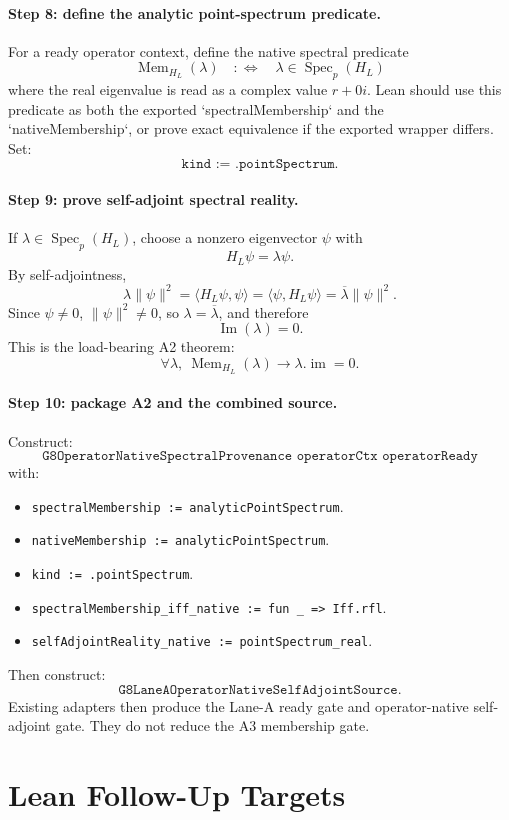 \documentclass[11pt]{article}
\newcommand{\im}{\operatorname{Im}}
\newcommand{\Mem}{\operatorname{Mem}}
\newcommand{\ptspec}{\operatorname{Spec}_{p}}
\begin{document}
\paragraph{Step 8: define the analytic point-spectrum predicate.}
For a ready operator context, define the native spectral predicate
\[
  \Mem_{H_L}(\lambda)
  \quad:\Longleftrightarrow\quad
  \lambda\in\ptspec(H_L)
\]
where the real eigenvalue is read as a complex value \(r+0i\).  Lean should use
this predicate as both the exported `spectralMembership` and the
`nativeMembership`, or prove exact equivalence if the exported wrapper differs.
Set:
\[
  \texttt{kind := .pointSpectrum}.
\]

\paragraph{Step 9: prove self-adjoint spectral reality.}
If \(\lambda\in\ptspec(H_L)\), choose a nonzero eigenvector \(\psi\) with
\[
  H_L\psi=\lambda\psi.
\]
By self-adjointness,
\[
  \lambda\|\psi\|^2
  =
  \langle H_L\psi,\psi\rangle
  =
  \langle \psi,H_L\psi\rangle
  =
  \overline{\lambda}\|\psi\|^2.
\]
Since \(\psi\ne0\), \(\|\psi\|^2\ne0\), so \(\lambda=\overline{\lambda}\), and
therefore
\[
  \im(\lambda)=0.
\]
This is the load-bearing A2 theorem:
\[
  \forall \lambda,\ \Mem_{H_L}(\lambda)\to\lambda.\operatorname{im}=0.
\]

\paragraph{Step 10: package A2 and the combined source.}
Construct:
\[
  \texttt{G8OperatorNativeSpectralProvenance operatorCtx operatorReady}
\]
with:
\begin{itemize}
\item \texttt{spectralMembership := analyticPointSpectrum}.
\item \texttt{nativeMembership := analyticPointSpectrum}.
\item \texttt{kind := .pointSpectrum}.
\item \texttt{spectralMembership\_iff\_native := fun \_ => Iff.rfl}.
\item \texttt{selfAdjointReality\_native := pointSpectrum\_real}.
\end{itemize}
Then construct:
\[
  \texttt{G8LaneAOperatorNativeSelfAdjointSource}.
\]
Existing adapters then produce the Lane-A ready gate and operator-native
self-adjoint gate.  They do not reduce the A3 membership gate.

\section*{Lean Follow-Up Targets}
\end{document}
